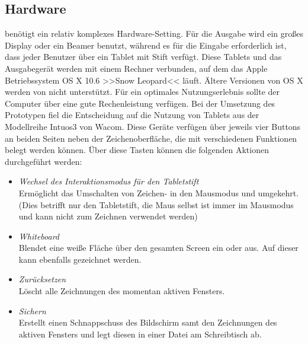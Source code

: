 \subsection{Hardware} \label{ssec:hardware} 
\scribbler benötigt ein relativ komplexes Hardware-Setting. Für die Ausgabe wird ein großes Display oder ein Beamer benutzt, während es für die Eingabe erforderlich ist, dass jeder Benutzer über ein Tablet mit Stift verfügt. Diese Tablets und das Ausgabegerät werden mit einem Rechner verbunden, auf dem das Apple Betriebssystem OS X 10.6 >>Snow Leopard<< läuft. Ältere Versionen von OS X werden von \scribbler nicht unterstützt. Für ein optimales Nutzungserlebnis sollte der Computer über eine gute Rechenleistung verfügen. Bei der Umsetzung des Prototypen fiel die Entscheidung auf die Nutzung von Tablets aus der Modellreihe Intuos3 von Wacom. Diese Geräte verfügen über jeweils vier Buttons an beiden Seiten neben der Zeichenoberfläche, die mit verschiedenen Funktionen belegt werden können. Über diese Tasten können die folgenden Aktionen durchgeführt werden:

\begin{itemize}
	\item \emph{Wechsel des Interaktionsmodus für den Tabletstift}\\
	Ermöglicht das Umschalten von Zeichen- in den Mausmodus und umgekehrt. (Dies betrifft nur den Tabletstift, die Maus selbst ist immer im Mausmodus und kann nicht zum Zeichnen verwendet werden)
	\item \emph{Whiteboard}\\
	Blendet eine weiße Fläche über den gesamten Screen ein oder aus. Auf dieser kann ebenfalls gezeichnet werden.
	\item \emph{Zurücksetzen}\\
	Löscht alle Zeichnungen des momentan aktiven Fensters.
	\item \emph{Sichern}\\
	Erstellt einen Schnappschuss des Bildschirm samt den Zeichnungen des aktiven Fensters und legt diesen in einer Datei am Schreibtisch ab.
\end{itemize}

